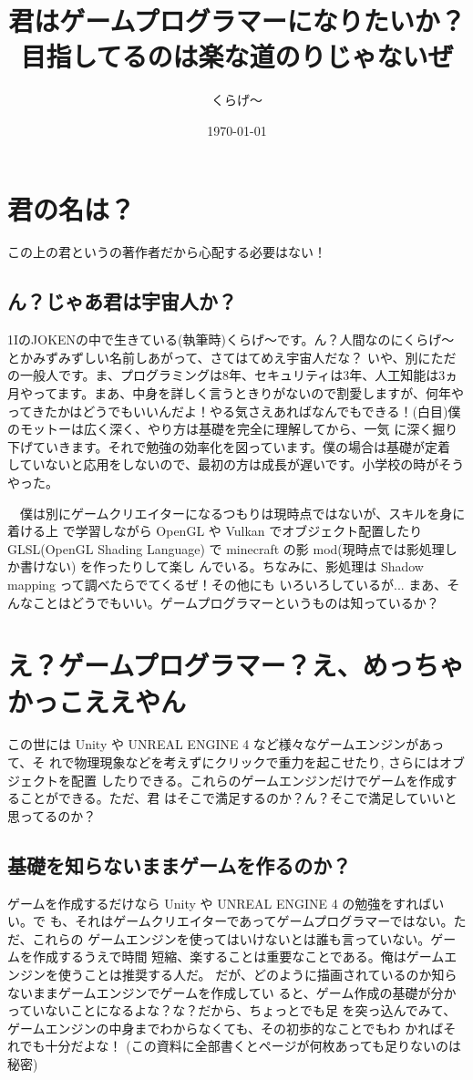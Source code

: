 \documentclass[a4paper,titlepage,dvipdfmx]{jsarticle}
\title{君はゲームプログラマーになりたいか？ \\ 目指してるのは楽な道のりじゃないぜ}
\author{くらげ～}
\date{\today}
\begin{document}
\maketitle

\section{君の名は？}
この上の君というの著作者だから心配する必要はない！

\subsection{ん？じゃあ君は宇宙人か？}
1IのJOKENの中で生きている(執筆時)くらげ～です。ん？人間なのにくらげ～とかみずみずしい名前しあがって、さてはてめえ宇宙人だな？
いや、別にただの一般人です。ま、プログラミングは8年、セキュリティは3年、人工知能は3ヵ月やってます。まあ、中身を詳しく言うときりがないので割愛しますが、何年やってきたかはどうでもいいんだよ！やる気さえあればなんでもできる！(白目)僕のモットーは広く深く、やり方は基礎を完全に理解してから、一気 に深く掘り下げていきます。それで勉強の効率化を図っています。僕の場合は基礎が定着 していないと応用をしないので、最初の方は成長が遅いです。小学校の時がそうやった。 

　僕は別にゲームクリエイターになるつもりは現時点ではないが、スキルを身に着ける上 で学習しながら OpenGL や Vulkan でオブジェクト配置したり GLSL(OpenGL Shading Language) で minecraft の影 mod(現時点では影処理しか書けない) を作ったりして楽し んでいる。ちなみに、影処理は Shadow mapping って調べたらでてくるぜ！その他にも いろいろしているが... まあ、そんなことはどうでもいい。ゲームプログラマーというものは知っているか？

\section{え？ゲームプログラマー？え、めっちゃかっこええやん}
この世には Unity や UNREAL ENGINE 4 など様々なゲームエンジンがあって、そ れで物理現象などを考えずにクリックで重力を起こせたり, さらにはオブジェクトを配置 したりできる。これらのゲームエンジンだけでゲームを作成することができる。ただ、君 はそこで満足するのか？ん？そこで満足していいと思ってるのか？

\subsection{基礎を知らないままゲームを作るのか？}
ゲームを作成するだけなら Unity や UNREAL ENGINE 4 の勉強をすればいい。で も、それはゲームクリエイターであってゲームプログラマーではない。ただ、これらの ゲームエンジンを使ってはいけないとは誰も言っていない。ゲームを作成するうえで時間 短縮、楽することは重要なことである。俺はゲームエンジンを使うことは推奨する人だ。 だが、どのように描画されているのか知らないままゲームエンジンでゲームを作成してい ると、ゲーム作成の基礎が分かっていないことになるよな？な？だから、ちょっとでも足 を突っ込んでみて、ゲームエンジンの中身までわからなくても、その初歩的なことでもわ かればそれでも十分だよな！ (この資料に全部書くとページが何枚あっても足りないのは 秘密)
\end{document}
